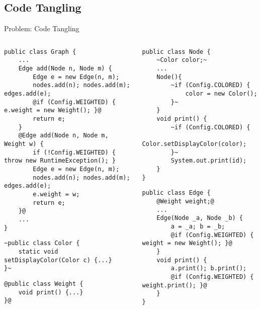 \subsection{Code Tangling}
\begin{frame}[fragile]{Problem: Code Tangling }
		\begin{columns}
\begin{tiny}
\begin{lstlisting}
public class Graph {
	...
	Edge add(Node n, Node m) {
		Edge e = new Edge(n, m);
		nodes.add(n); nodes.add(m); edges.add(e);
		@if (Config.WEIGHTED) { e.weight = new Weight(); }@
		return e;
	}
	@Edge add(Node n, Node m, Weight w) {
		if (!Config.WEIGHTED) { throw new RuntimeException(); }
		Edge e = new Edge(n, m);
		nodes.add(n); nodes.add(m); edges.add(e);
		e.weight = w;
		return e;
	}@
	...
}
\end{lstlisting}
\begin{lstlisting}
~public class Color {
	static void setDisplayColor(Color c) {...}
}~
\end{lstlisting}
\begin{lstlisting}
@public class Weight {
	void print() {...}
}@
\end{lstlisting}
\end{tiny}	
\begin{tiny}
\begin{lstlisting}
public class Node {
	~Color color;~
	...
	Node(){
		~if (Config.COLORED) { 
			color = new Color(); 
		}~
	}
	void print() {
		~if (Config.COLORED) { 
			Color.setDisplayColor(color); 
		}~
		System.out.print(id);
	}
}
\end{lstlisting}
\begin{lstlisting}
public class Edge {
	@Weight weight;@
	...
	Edge(Node _a, Node _b) {
		a = _a; b = _b;
		@if (Config.WEIGHTED) { weight = new Weight(); }@
	}
	void print() {
		a.print(); b.print();
		@if (Config.WEIGHTED) { weight.print(); }@
	}
}
\end{lstlisting}
\end{tiny}	
		\end{columns}
\end{frame}

